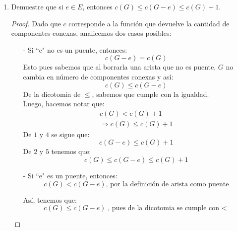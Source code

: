 \documentclass{article}
\begin{document}
  \begin{enumerate}
    \item Demuestre que si $e \in E$, entonces $c(G) \le c(G-e) \le c(G) + 1$.

      \renewcommand\qedsymbol{QED}
      \begin{proof}
        Dado que $c$ corresponde a la función que devuelve la cantidad de componentes
        conexas, analicemos dos casos posibles:

        \begin{itemize}
        \item[-] Si ``e" no es un puente, entonces:
          \begin{equation}
            c(G -e) = c(G)
          \end{equation}
          Esto pues sabemos que al borrarla una arista  que no es puente, $G$ no cambia en
          número de componentes conexas y así:
          \begin{equation}
            c(G) \leq c(G -e)
          \end{equation}
          De la dicotomia de $\leq$, sabemos que cumple con la igualdad. \\
          Luego, hacemos notar que:
          \begin{eqnarray}
            c(G) < c(G) +1\\
            \Rightarrow c(G) \leq c(G) +1
          \end{eqnarray}
          De $1$ y $4$ se sigue que:
          \begin{equation}
            c(G -e) \leq c(G) +1
          \end{equation}
          De $2$ y $5$ tenemos que:
          \[
          c(G) \le c(G-e) \le c(G) + 1
          \]

        \item[-] Si ``e" es un puente, entonces:
          \begin{equation}
            c(G) < c(G -e) \text{, por la definición de arista como puente}
          \end{equation}

          Así, tenemos que:
          \begin{equation}
            c(G) \leq c(G -e) \text{, pues de la dicotomia se cumple con $<$}
          \end{equation}


\end{itemize}
\end{proof}
\end{enumerate}
\end{document}
